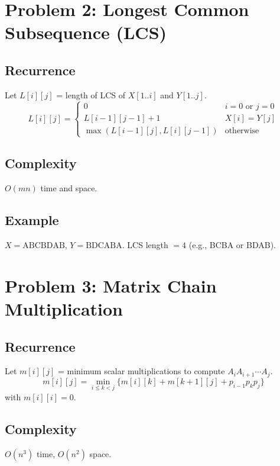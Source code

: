 \documentclass[12pt]{article}
\begin{document}
\section{Problem 2: Longest Common Subsequence (LCS)}

\subsection*{Recurrence}
Let $L[i][j]$ = length of LCS of $X[1..i]$ and $Y[1..j]$.
\[
  L[i][j] = \begin{cases}
    0 & i=0 \text{ or } j=0 \\
    L[i-1][j-1]+1 & X[i]=Y[j] \\
    \max(L[i-1][j], L[i][j-1]) & \text{otherwise}
  \end{cases}
\]
\subsection*{Complexity} $O(mn)$ time and space.

\subsection*{Example}
$X = \text{ABCBDAB}$, $Y = \text{BDCABA}$. LCS length $= 4$ (e.g., BCBA or BDAB).

\section{Problem 3: Matrix Chain Multiplication}

\subsection*{Recurrence}
Let $m[i][j]$ = minimum scalar multiplications to compute $A_i A_{i+1} \cdots A_j$.
\[
  m[i][j] = \min_{i \leq k < j} \bigl\{ m[i][k] + m[k+1][j] + p_{i-1} p_k p_j \bigr\}
\]
with $m[i][i] = 0$.

\subsection*{Complexity} $O(n^3)$ time, $O(n^2)$ space.
\end{document}
